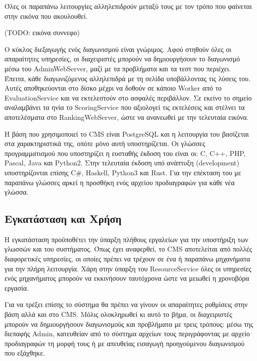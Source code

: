 \documentclass[diploma]{softlab-thesis}
\begin{document}
\bigskip

Όλες οι παραπάνω λειτουργίες αλληλεπιδρούν μεταξύ τους με τον τρόπο που φαίνεται
στην εικόνα που ακουλουθεί.

(TODO: εικόνα συννεφο)

\bigskip

Ο κύκλος διεξαγωγής ενός διαγωνισμού είναι γνώριμος. Αφού στηθούν όλες οι
απαραίτητες υπηρεσίες, οι διαχειριστές μπορούν να δημιουργήσουν το διαγωνισμό
μέσω του AdminWebServer, μαζί με τα προβλήματα και τα τεστ που περιέχει.
Έπειτα, κάθε διαγωνιζόμενος αλληλεπιδρά με τη σελίδα υποβάλλοντας τις λύσεις
του. Αυτές αποθηκεύονται στο δίσκο μέχρι να δοθούν σε κάποιο Worker από το
EvaluationService και να εκτελεστούν στο ασφαλές περιβάλλον. Σε εκείνο το
σημείο αναλαμβάνει τα ηνία το ScoringService που αξιολογεί τις εκτελέσεις και
στέλνει τα αποτελέσματα στο RankingWebServer, ώστε να ανανεωθεί με την
τελευταία εικόνα.

\bigskip

Η βάση που χρησιμοποιεί το CMS είναι PostgreSQL και η λειτουργία του βασίζεται
στα χαρακτηριστικά της, οπότε μόνο αυτή υποστηρίζεται. Οι γλώσσες προγραμματισμού
που υποστηρίζει η ευσταθής έκδοση του είναι οι: C, C++, PHP, Pascal, Java και
Python2. Στην τελευταία έκδοση υπό ανάπτυξη (development) υποστηρίζονται επίσης
C\#, Haskell, Python3 και Rust. Για την επέκταση του με παραπάνω γλώσσες αρκεί
η προσθήκη ενός αρχείου προδιαγραφών για κάθε νέα γλώσσα.


\subsection{Εγκατάσταση και Χρήση}

Η εγκατάσταση προϋποθέτει την ύπαρξη πλήθους εργαλείων για την υποστήριξη των
γλωσσών και του συστήματος. Όπως έχει αναφερθεί, το CMS αποτελείται από πολλές
διαφορετικές υπηρεσίες, οι οποίες πρέπει να τρέχουν σε ένα ή παραπάνω μηχανήματα
για την πλήρη λειτουργία. Χάρη στην ύπαρξη του ResourceService όλες οι υπηρεσίες
ενός μηχανήματος μπορούν να εκκινήσουν ταυτόχρονα ώστε να μειωθεί η χρονοβόρα
εργασία.

\bigskip

Για να τρέξει επίσης το σύστημα θα πρέπει να γίνουν οι απαραίτητες ρυθμίσεις
στην βάση αλλά και στο CMS. Μόλις ολοκληρωθεί κι αυτό το βήμα, οι διαχειριστές
μπορούν να δημιουργήσουν διαγωνισμούς και προβλήματα με τρεις τρόπους: μέσω της
διεπαφής Admin, κατευθείαν από το σύστημα αρχείων τους περιγράφοντας με αρχείο
προδιαγραφών τη μορφή τους ή με απευθείας εισαγωγή προηγούμενου διαγωνισμού που
εξάχθηκε.
\end{document}
